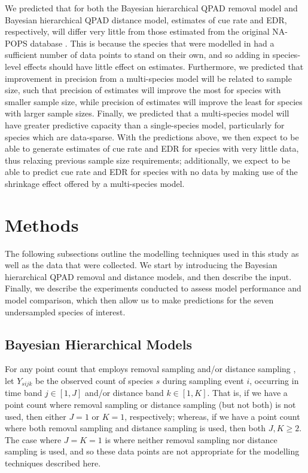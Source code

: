 \documentclass[12pt]{article}
\begin{document}
\par We predicted that for both the Bayesian hierarchical QPAD removal model and Bayesian hierarchical QPAD distance model, estimates of cue rate and EDR, respectively, will differ very little from those estimated from the original NA-POPS database \cite{edwards_point_2023}. 
This is because the species that were modelled in \citet{edwards_point_2023} had a sufficient number of data points to stand on their own, and so adding in species-level effects should have little effect on estimates. 
Furthermore, we predicted that improvement in precision from a multi-species model will be related to sample size, such that precision of estimates will improve the most for species with smaller sample size, while precision of estimates will improve the least for species with larger sample sizes.
Finally, we predicted that a multi-species model will have greater predictive capacity than a single-species model, particularly for species which are data-sparse.
With the predictions above, we then expect to be able to generate estimates of cue rate and EDR for species with very little data, thus relaxing previous sample size requirements; additionally, we expect to be able to predict cue rate and EDR for species with no data by making use of the shrinkage effect offered by a multi-species model.

\section{Methods}

\par The following subsections outline the modelling techniques used in this study as well as the data that were collected. 
We start by introducing the Bayesian hierarchical QPAD removal and distance models, and then describe the input.
Finally, we describe the experiments conducted to assess model performance and model comparison, which then allow us to make predictions for the seven undersampled species of interest.

\subsection{Bayesian Hierarchical Models}

\par For any point count that employs removal sampling \citep{alldredge_time--detection_2007, farnsworth_removal_2002} and/or distance sampling \citep{buckland_introduction_2001, buckland_distance_2015}, let $Y_{sijk}$ be the observed count of species $s$ during sampling event $i$, occurring in time band $j \in [1,J]$ and/or distance band $k \in [1,K]$.
That is, if we have a point count where removal sampling or distance sampling (but not both) is not used, then either $J = 1$ or $K = 1$, respectively; whereas, if we have a point count where both removal sampling and distance sampling is used, then both $J,K \geq 2$.
The case where $J = K = 1$ is where neither removal sampling nor distance sampling is used, and so these data points are not appropriate for the modelling techniques described here.
\end{document}
